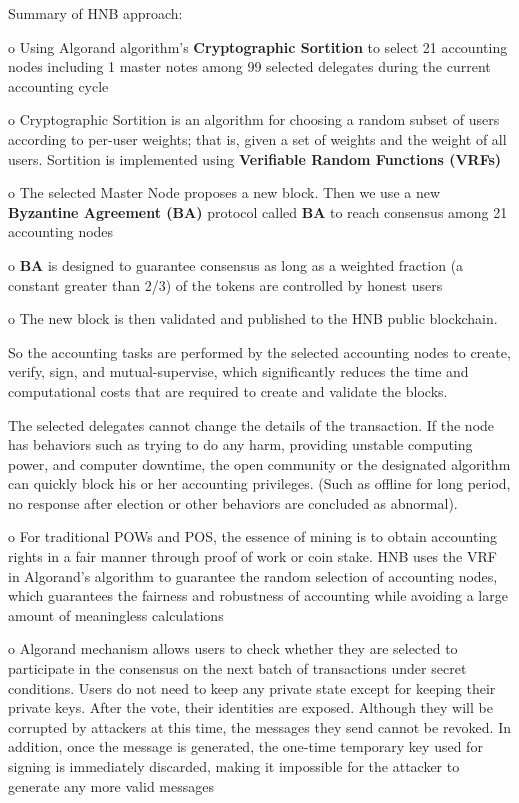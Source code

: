 \documentclass[fleqn,10pt]{SelfArx} %
\begin{document}
Summary of HNB approach:

o	Using Algorand algorithm’s \textbf{Cryptographic Sortition} to select 21 accounting nodes including 1 master notes among 99 selected delegates during the current accounting cycle

o	Cryptographic Sortition is an algorithm for choosing a random subset of users according to per-user weights; that is, given a set of weights and the weight of all users. Sortition is implemented using \textbf{Verifiable Random Functions (VRFs)}

o	The selected Master Node proposes a new block. Then we use a new \textbf{Byzantine Agreement (BA)} protocol called \textbf{BA} to reach consensus among 21 accounting nodes

o	\textbf{BA} is designed to guarantee consensus as long as a weighted fraction (a constant greater than 2/3) of the tokens are controlled by honest users

o	The new block is then validated and published to the HNB public blockchain.

So the accounting tasks are performed by the selected accounting nodes to create, verify, sign, and mutual-supervise, which significantly reduces the time and computational costs that are required to create and validate the blocks. 

The selected delegates cannot change the details of the transaction. If the node has behaviors such as trying to do any harm, providing unstable computing power, and computer downtime, the open community or the designated algorithm can quickly block his or her accounting privileges. (Such as offline for long period, no response after election or other behaviors are concluded as abnormal).



o	For traditional POWs and POS, the essence of mining is to obtain accounting rights in a fair manner through proof of work or coin stake. HNB uses the VRF in Algorand's algorithm to guarantee the random selection of accounting nodes, which guarantees the fairness and robustness of accounting while avoiding a large amount of meaningless calculations

o	Algorand mechanism allows users to check whether they are selected to participate in the consensus on the next batch of transactions under secret conditions. Users do not need to keep any private state except for keeping their private keys. After the vote, their identities are exposed. Although they will be corrupted by attackers at this time, the messages they send cannot be revoked. In addition, once the message is generated, the one-time temporary key used for signing is immediately discarded, making it impossible for the attacker to generate any more valid messages
\end{document}
